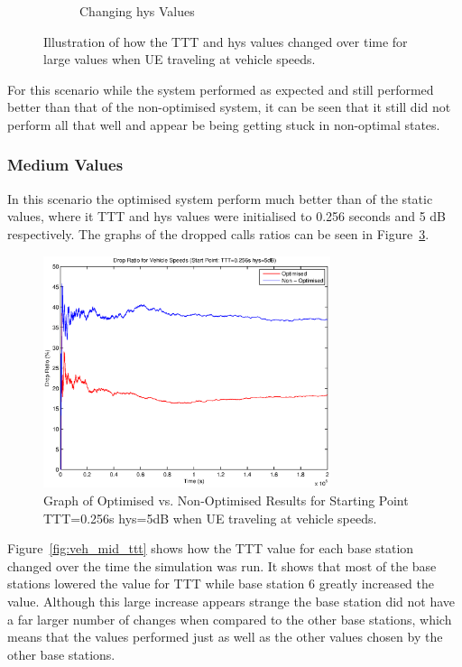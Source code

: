 \begin{figure}[H]
\begin{subfigure}[b]{0.49\textwidth}
                \caption{Changing hys Values}
                \label{fig:veh_high_hys}
        \end{subfigure}
        \caption{Illustration of how the TTT and hys values changed over time for large values when UE traveling at vehicle speeds.}\label{fig:veh_high_ttthys}
\end{figure}
For this scenario while the system performed as expected and still performed better than that of the non-optimised system, it can be seen that it still did not perform all that well and appear be being getting stuck in non-optimal states.
\subsubsection*{Medium Values}
In this scenario the optimised system perform much better than of the static values, where it TTT and hys values were initialised to 0.256 seconds and 5 dB respectively. The graphs of the dropped calls ratios can be seen in Figure~\ref{fig:veh_mid_drop}.
\begin{figure}[H]
  \begin{center}
    	  \includegraphics[width=0.75\textwidth]{figures/vehicle_figures/mid/long_drop.eps}
    \end{center}
    \caption{Graph of Optimised vs. Non-Optimised Results for Starting Point TTT=0.256s hys=5dB when UE traveling at vehicle speeds.}
    \label{fig:veh_mid_drop}
\end{figure}
Figure~\ref{fig:veh_mid_ttt} shows how the TTT value for each base station changed over the time the simulation was run. It shows that most of the base stations lowered the value for TTT while base station 6 greatly increased the value. Although this large increase appears strange the base station did not have a far larger number of changes when compared to the other base stations, which means that the values performed just as well as the other values chosen by the other base stations. 

